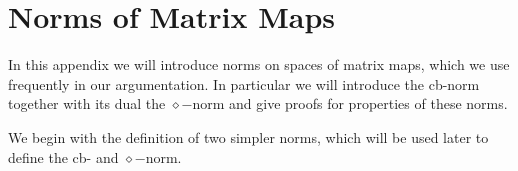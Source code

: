 \documentclass[a4paper
               ,12pt
               ,DIV=12
               ,oneside
               ]
               {amsart}
\theoremstyle{plain}
\newtheorem{lem}{Lemma}
\theoremstyle{remark}
\def\lb{\left(}
\def\rb{\right)}
\def\lset{\lbrace}
\def\rset{\rbrace}
\def\rk{\right\rangle}
\def\l|{\left|}
\newcommand\C{\mathbb{C}}
\newcommand\R{\mathbb{R}}
\newcommand\N{\mathbb{N}}
\begin{document}
\section*{Norms of Matrix Maps}

In this appendix we will introduce norms on spaces of matrix maps, which we use frequently in our argumentation. In particular we will introduce the cb-norm together with its dual the $\diamond-$norm and give proofs for properties of these norms. 

We begin with the definition of two simpler norms, which will be used later to define the cb- and $\diamond-$norm.

%
%
%
%
%
\end{document}
